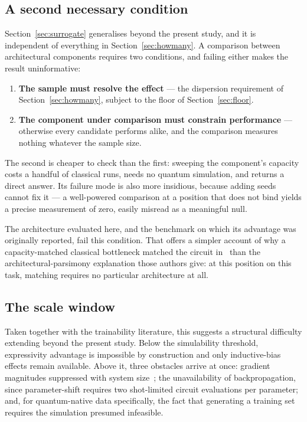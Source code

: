 \documentclass[11pt,onecolumn]{article}
\begin{document}
\subsection{A second necessary condition}\label{sec:second}
Section~\ref{sec:surrogate} generalises beyond the present study, and it
is independent of everything in Section~\ref{sec:howmany}. A comparison
between architectural components requires two conditions, and failing
either makes the result uninformative:

\begin{enumerate}\itemsep2pt
\item \textbf{The sample must resolve the effect} --- the dispersion
      requirement of Section~\ref{sec:howmany}, subject to the floor of
      Section~\ref{sec:floor}.
\item \textbf{The component under comparison must constrain
      performance} --- otherwise every candidate performs alike, and the
      comparison measures nothing whatever the sample size.
\end{enumerate}

The second is cheaper to check than the first: sweeping the component's
capacity costs a handful of classical runs, needs no quantum simulation,
and returns a direct answer. Its failure mode is also more insidious,
because adding seeds cannot fix it --- a well-powered comparison at a
position that does not bind yields a precise measurement of zero, easily
misread as a meaningful null.

The architecture evaluated here, and the benchmark on which its
advantage was originally reported, fail this condition. That offers a
simpler account of why a capacity-matched classical bottleneck matched
the circuit in~\cite{qasa} than the architectural-parsimony explanation
those authors give: at this position on this task, matching requires no
particular architecture at all.

\subsection{The scale window}
Taken together with the trainability literature, this suggests a
structural difficulty extending beyond the present study. Below the
simulability threshold, expressivity advantage is impossible by
construction and only inductive-bias effects remain available. Above it,
three obstacles arrive at once: gradient magnitudes suppressed with
system size~\cite{cerezo2021}; the unavailability of backpropagation,
since parameter-shift requires two shot-limited circuit evaluations per
parameter; and, for quantum-native data specifically, the fact that
generating a training set requires the simulation presumed infeasible.
\end{document}
